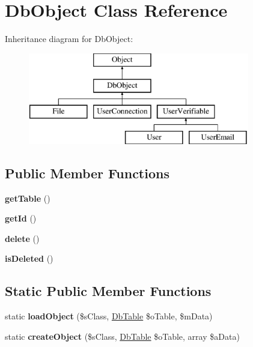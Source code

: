 \hypertarget{class_db_object}{\section{Db\-Object Class Reference}
\label{class_db_object}
}
Inheritance diagram for Db\-Object\-:\begin{figure}[H]
\begin{center}
\leavevmode
\includegraphics[height=4.000000cm]{class_db_object}
\end{center}
\end{figure}
\subsection*{Public Member Functions}
\begin{DoxyCompactItemize}
\item 
\hypertarget{class_db_object_ab927f1a5cac1905a0be1452d0ef76aac}{{\bfseries get\-Table} ()}\label{class_db_object_ab927f1a5cac1905a0be1452d0ef76aac}

\item 
\hypertarget{class_db_object_a38e5ae3d5bf25b14cbaf70abe7e8159c}{{\bfseries get\-Id} ()}\label{class_db_object_a38e5ae3d5bf25b14cbaf70abe7e8159c}

\item 
\hypertarget{class_db_object_afba4ed3fd0560178f3dde75ca5f71b8d}{{\bfseries delete} ()}\label{class_db_object_afba4ed3fd0560178f3dde75ca5f71b8d}

\item 
\hypertarget{class_db_object_a3e1d2098bd1491048f134dc8fcde055c}{{\bfseries is\-Deleted} ()}\label{class_db_object_a3e1d2098bd1491048f134dc8fcde055c}

\end{DoxyCompactItemize}
\subsection*{Static Public Member Functions}
\begin{DoxyCompactItemize}
\item 
\hypertarget{class_db_object_a813b689e7068a22105afb141278a1d9b}{static {\bfseries load\-Object} (\$s\-Class, \hyperlink{class_db_table}{Db\-Table} \$o\-Table, \$m\-Data)}\label{class_db_object_a813b689e7068a22105afb141278a1d9b}

\item 
\hypertarget{class_db_object_a56672a926429d4580f3e45b3a5ee5c23}{static {\bfseries create\-Object} (\$s\-Class, \hyperlink{class_db_table}{Db\-Table} \$o\-Table, array \$a\-Data)}\label{class_db_object_a56672a926429d4580f3e45b3a5ee5c23}

\end{DoxyCompactItemize}
